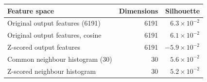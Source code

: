 \begin{tabular}{lrr}
\toprule
Feature space & Dimensions & Silhouette \\
\midrule
Original output features (6191) & 6191 & $6.3\times10^{-2}$ \\
Original output features, cosine & 6191 & $6.1\times10^{-2}$ \\
Z-scored output features & 6191 & $-5.9\times10^{-2}$ \\
Common neighbour histogram (30) & 30 & $5.6\times10^{-2}$ \\
Z-scored neighbour histogram & 30 & $5.2\times10^{-2}$ \\
\bottomrule
\end{tabular}
